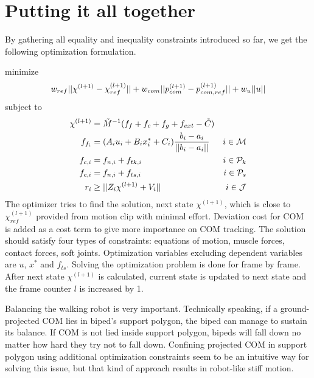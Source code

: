 \documentclass{acm_proc_article-sp}
\begin{document}
\section{Putting it all together}
By gathering all equality and inequality constraints introduced so far,
we get the following optimization formulation.

minimize
\begin{equation}\notag
w_{ref} || \chi^{(l+1)} - \chi^{(l+1)}_{ref} || +
w_{com} || p^{(l+1)}_{com} - p^{(l+1)}_{com,ref} || + w_u || u ||
\end{equation}
subject to
\begin{align}
\chi^{(l+1)} &= \tilde{M}^{-1} (f_f + f_c + f_g + f_{ext} - \tilde{C})          &                        \notag   \\
f_{f_i}      &= (A_i u_i + B_i x_i^* + C_i) \frac{b_i - a_i}{ || b_i - a_i || } & i \in \mathcal{M}      \notag   \\
f_{c,i}      &= f_{n,i} + f_{tk, i}                                             & i \in \mathcal{P}_k    \notag   \\
f_{c,i}      &= f_{n,i} + f_{ts, i}                                             & i \in \mathcal{P}_s    \notag   \\
r_i          &\geq || Z_i \chi^{(l+1)} + V_i ||                                 & i \in \mathcal{J}      \notag
\end{align}
The optimizer tries to find the solution, next state $\chi^{(l+1)}$, which is
close to $\chi^{(l+1)}_{ref}$ provided from motion clip with minimal effort.
Deviation cost for COM is added as a cost term to give more importance on COM tracking.
The solution should satisfy four types of constraints:
equations of motion, muscle forces, contact forces, soft joints.
Optimization variables excluding dependent variables are $u$, $x^*$ and $f_{ts}$.
Solving the optimization problem is done for frame by frame.
After next state $\chi^{(l+1)}$ is calculated, current state is updated to
next state and the frame counter $l$ is increased by 1.

Balancing the walking robot is very important.
Technically speaking, if a ground-projected COM lies
in biped's support polygon, the biped can manage to sustain
its balance. If COM is not lied inside support polygon,
bipeds will fall down no matter how hard they try not to
fall down.
Confining projected COM in support polygon
using additional optimization constraints seem to be
an intuitive way for solving this issue, but that kind
of approach results in robot-like stiff motion.
\end{document}
